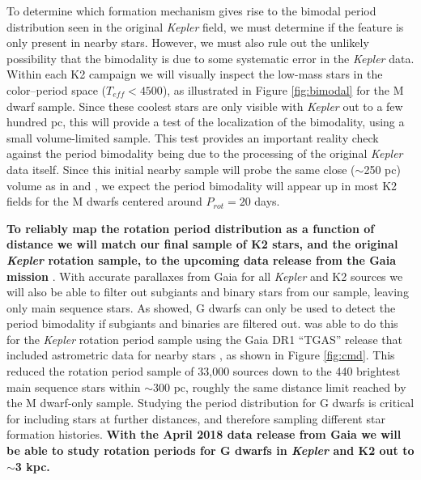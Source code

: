 \documentclass[12pt]{article}
\newcommand{\Kepler}{\textsl{Kepler}\xspace}
\begin{document}
To determine which formation mechanism gives rise to the bimodal period distribution seen in the original \Kepler field, we must determine if the feature is only present in nearby stars. However, we must also rule out the unlikely possibility that the bimodality is due to some systematic error in the \Kepler data. Within each K2 campaign we will visually inspect the low-mass stars in the color--period space ($T_{eff}<4500$), as illustrated in Figure \ref{fig:bimodal} for the \citet{mcquillan2013} M dwarf sample. Since these coolest stars are only visible with \Kepler out to a few hundred pc, this will provide a test of the localization of the bimodality, using a small volume-limited sample. This test provides an important reality check against the period bimodality being due to the processing of the original \Kepler data itself. Since this initial nearby sample will probe the same close ($\sim$250 pc) volume as in \citet{mcquillan2013} and \citet{davenport2017}, we expect the period bimodality will appear up in most K2 fields for the M dwarfs centered around $P_{rot}=20$ days.



{\bf To reliably map the rotation period distribution as a function of distance we will match our final sample of K2 stars, and the original \Kepler rotation sample, to the upcoming data release from the Gaia mission} \citep{perryman2001}. With accurate parallaxes from Gaia for all \Kepler and K2 sources we will also be able to filter out subgiants and binary stars from our sample, leaving only main sequence stars. As \citet{davenport2017} showed, G dwarfs can only be used to detect the period bimodality if subgiants and binaries are filtered out.\citet{davenport2017} was able to do this for the \Kepler rotation period sample using the Gaia DR1 ``TGAS'' release that included astrometric data for nearby stars \citep{gaia_dr1}, as shown in Figure \ref{fig:cmd}. This reduced the \citet{mcquillan2014} rotation period sample of 33,000 sources down to the 440 brightest main sequence stars within $\sim$300 pc, roughly the same distance limit reached by the M dwarf-only sample. Studying the period distribution for G dwarfs is critical for including stars at further distances, and therefore sampling different star formation histories. {\bf With the April 2018 data release from Gaia we will be able to study rotation periods for G dwarfs in \Kepler and K2 out to $\sim$3 kpc.}


\end{document}
